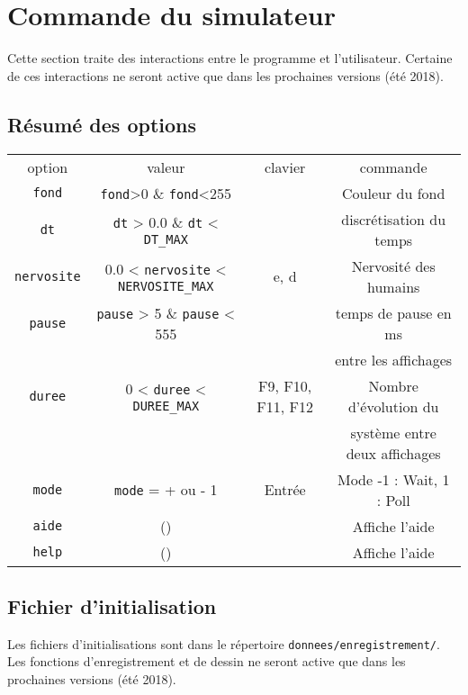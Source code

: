 \section{Commande du simulateur}
%
Cette section traite des interactions entre le programme et l'utilisateur. Certaine de ces interactions ne seront active que dans les prochaines versions (été 2018).
%
\subsection{Résumé des options}
\begin{center}
\begin{tabular}{cccc}
option & valeur & clavier & commande \\
\texttt{fond} & \texttt{fond}>0 \& \texttt{fond}<255 &  & Couleur du fond \\
\texttt{dt} & \texttt{dt} > 0.0 \& \texttt{dt} < \texttt{DT\_MAX} &  & discrétisation du temps \\
\texttt{nervosite} & 0.0 < \texttt{nervosite} < \texttt{NERVOSITE\_MAX} & {\sf e}, {\sf d} & Nervosité des humains \\
\texttt{pause} & \texttt{pause} > 5 \& \texttt{pause} < 555 &  & temps de pause en ms \\
 &  &  & entre les affichages \\
\texttt{duree} & 0 < \texttt{duree} < \texttt{DUREE\_MAX} & {\sf F9}, {\sf F10}, {\sf F11}, {\sf F12} & Nombre d'évolution du \\
 &  &  & système entre deux affichages \\
\texttt{mode} & \texttt{mode} = + ou - 1 & {\sf Entrée} & Mode -1 : Wait, 1 : Poll \\
\texttt{aide} & () &  & Affiche l'aide \\
\texttt{help} & () &  & Affiche l'aide \\
\end{tabular}
\end{center}
%
\subsection{Fichier d'initialisation}
%
Les fichiers d'initialisations sont dans le répertoire \texttt{donnees/enregistrement/}. Les fonctions d'enregistrement et de dessin ne seront active que dans les prochaines versions (été 2018).
%
